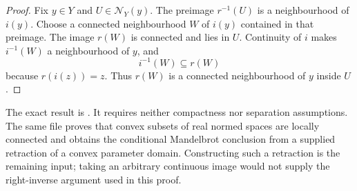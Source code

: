\begin{proof}
Fix $y\in Y$ and $U\in\mathcal N_Y(y)$.  The preimage
$r^{-1}(U)$ is a neighbourhood of $i(y)$.  Choose a connected
neighbourhood $W$ of $i(y)$ contained in that preimage.
The image $r(W)$ is connected and lies in $U$.
Continuity of $i$ makes $i^{-1}(W)$ a neighbourhood of $y$, and
\[
 i^{-1}(W)\subseteq r(W)
\]
because $r(i(z))=z$.  Thus $r(W)$ is a connected neighbourhood
of $y$ inside $U$.
\end{proof}

The exact result is
.
It requires neither compactness nor separation assumptions.
The same file proves that convex subsets of real normed spaces are
locally connected and obtains the conditional Mandelbrot conclusion
from a supplied retraction of a convex parameter domain.
Constructing such a retraction is the remaining input; taking an
arbitrary continuous image would not supply the right-inverse
argument used in this proof.
